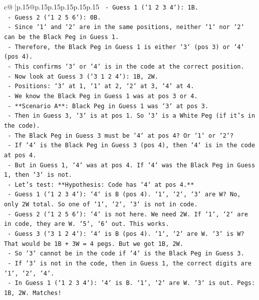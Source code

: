 \documentclass{article}
\begin{document}
{\begin{supertabular}{c@{$\;$}|p{.15\linewidth}@{}p{.15\linewidth}p{.15\linewidth}p{.15\linewidth}p{.15\linewidth}p{.15\linewidth}}
{{{\texttt{    {-} Guess 1 (`1 2 3 4`): 1B.} \\
\texttt{    {-} Guess 2 (`1 2 5 6`): 0B.} \\
\texttt{    {-} Since `1` and `2` are in the same positions, neither `1` nor `2` can be the Black Peg in Guess 1.} \\
\texttt{    {-} Therefore, the Black Peg in Guess 1 is either `3` (pos 3) or `4` (pos 4).} \\
\texttt{    {-} This confirms `3` or `4` is in the code at the correct position.} \\
\texttt{    {-} Now look at Guess 3 (`3 1 2 4`): 1B, 2W.} \\
\texttt{    {-} Positions: `3` at 1, `1` at 2, `2` at 3, `4` at 4.} \\
\texttt{    {-} We know the Black Peg in Guess 1 was at pos 3 or 4.} \\
\texttt{    {-} **Scenario A**: Black Peg in Guess 1 was `3` at pos 3.} \\
\texttt{        {-} Then in Guess 3, `3` is at pos 1. So `3` is a White Peg (if it's in the code).} \\
\texttt{        {-} The Black Peg in Guess 3 must be `4` at pos 4? Or `1` or `2`?} \\
\texttt{        {-} If `4` is the Black Peg in Guess 3 (pos 4), then `4` is in the code at pos 4.} \\
\texttt{        {-} But in Guess 1, `4` was at pos 4. If `4` was the Black Peg in Guess 1, then `3` is not.} \\
\texttt{        {-} Let's test: **Hypothesis: Code has `4` at pos 4.**} \\
\texttt{            {-} Guess 1 (`1 2 3 4`): `4` is B (pos 4). `1`, `2`, `3` are W? No, only 2W total. So one of `1`, `2`, `3` is not in code.} \\
\texttt{            {-} Guess 2 (`1 2 5 6`): `4` is not here. We need 2W. If `1`, `2` are in code, they are W. `5`, `6` out. This works.} \\
\texttt{            {-} Guess 3 (`3 1 2 4`): `4` is B (pos 4). `1`, `2` are W. `3` is W? That would be 1B + 3W = 4 pegs. But we got 1B, 2W.} \\
\texttt{            {-} So `3` cannot be in the code if `4` is the Black Peg in Guess 3.} \\
\texttt{            {-} If `3` is not in the code, then in Guess 1, the correct digits are `1`, `2`, `4`.} \\
\texttt{            {-} In Guess 1 (`1 2 3 4`): `4` is B. `1`, `2` are W. `3` is out. Pegs: 1B, 2W. Matches!} \\
}}}
\end{supertabular}}
\end{document}

